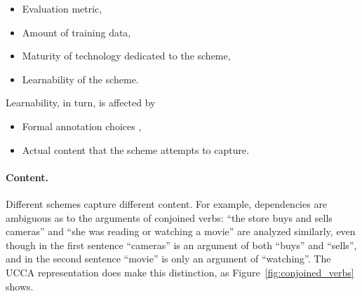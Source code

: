 \documentclass[11pt,a4paper]{article}
\begin{document}
\begin{itemize}
\item Evaluation metric,
\item Amount of training data,
\item Maturity of technology dedicated to the scheme,
\item Learnability of the scheme.
\end{itemize}

Learnability, in turn, is affected by
\begin{itemize}
\item Formal annotation choices \cite{Schwartz:12},
\item Actual content that the scheme attempts to capture.
\end{itemize}


\paragraph{Content.}

Different schemes capture different content.
For example, dependencies are ambiguous as to the arguments of conjoined verbs:
``the store buys and sells cameras'' and ``she was reading or watching a movie''
are analyzed similarly, even though in the first sentence ``cameras'' is an argument
of both ``buys'' and ``sells'', and in the second sentence ``movie'' is only an argument
of ``watching''.
The UCCA representation does make this distinction, as Figure~\ref{fig:conjoined_verbs} shows.
\end{document}
